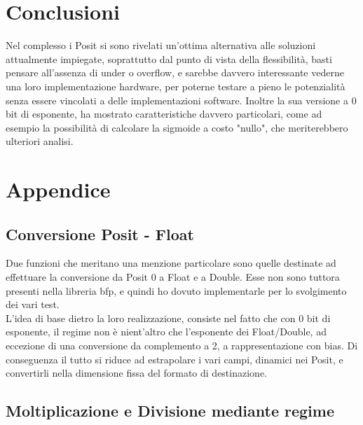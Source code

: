 \documentclass[a4paper,11pt]{article}
\begin{document}
\newpage
\section{Conclusioni}
Nel complesso i Posit si sono rivelati un'ottima alternativa alle soluzioni attualmente impiegate, soprattutto dal punto di vista della flessibilità, basti pensare all'assenza di under o overflow, e sarebbe davvero interessante vederne una loro implementazione hardware, per poterne testare a pieno le potenzialità senza essere vincolati a delle implementazioni software. Inoltre la sua versione a 0 bit di esponente, ha mostrato caratteristiche davvero particolari, come ad esempio la possibilità di calcolare la sigmoide a costo "nullo", che meriterebbero ulteriori analisi.

\newpage

\section{Appendice}
\subsection{Conversione Posit - Float}
Due funzioni che meritano una menzione particolare sono quelle destinate ad effettuare la conversione da Posit 0 a Float e a Double. Esse non sono tuttora presenti nella libreria bfp\cite{libbfp}, e quindi ho dovuto implementarle per lo svolgimento dei vari test.\\ L'idea di base dietro la loro realizzazione, consiste nel fatto che con 0 bit di esponente, il regime non è nient'altro che l'esponente dei Float/Double, ad eccezione di una conversione da complemento a 2, a rappresentazione con bias. Di conseguenza il tutto si riduce ad estrapolare i vari campi, dinamici nei Posit, e convertirli nella dimensione fissa del formato di destinazione.

\subsection{Moltiplicazione e Divisione mediante regime}
\end{document}
